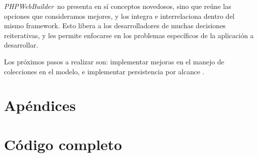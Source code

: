 \documentclass[a4paper,10pt,draft]{article}
\newcommand{\PWB}{\emph{PHPWebBuilder}}
\begin{document}
\PWB\ no presenta en sí conceptos novedosos, sino que reúne las opciones que consideramos mejores, y los integra e interrelaciona dentro del mismo framework. Esto libera a los desarrolladores de muchas decisiones reiterativas, y les permite enfocarse en los problemas específicos de la aplicación a desarrollar.

Los próximos pasos a realizar son: implementar mejoras en el manejo de colecciones en el modelo, e implementar persistencia por alcance \cite{jpox,jdo}.







\setcounter{section}{0}
\section*{Apéndices}
\section{Código completo}

\begin{lgrind}

\end{lgrind}

\begin{lgrind}

\end{lgrind}
\end{document}
